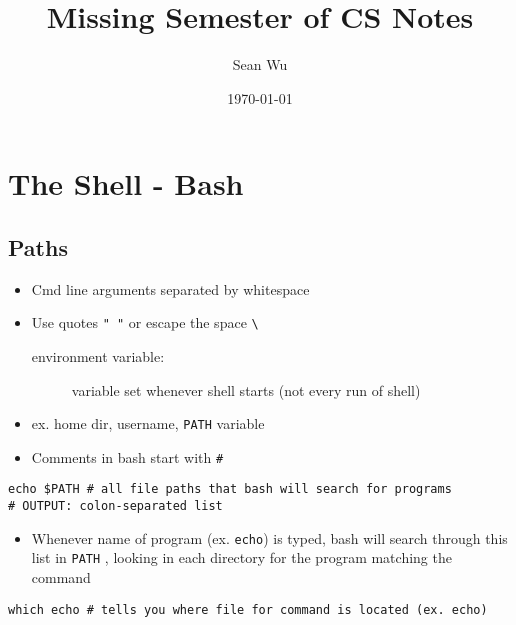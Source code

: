\documentclass[letterpaper,12pt]{article}
\begin{document}
\title{Missing Semester of CS Notes}
\author{Sean Wu}
\date{\today}
\maketitle

\tableofcontents

\pagebreak

\setlength{\parindent}{0em}
\setlength{\parskip}{1em}

\section{The Shell - Bash}

\subsection{Paths}

\begin{itemize}
 \item Cmd line arguments separated by whitespace
 \item Use quotes \lstinline{" "} or escape the space \lstinline{\ }

       \begin{description}
        \item[environment variable:] variable set whenever shell starts (not every run of shell)
       \end{description}

 \item ex. home dir, username, \lstinline{PATH} variable
 \item Comments in bash start with \lstinline{#}
\end{itemize}

\begin{lstlisting}
echo $PATH # all file paths that bash will search for programs
# OUTPUT: colon-separated list
\end{lstlisting}

\begin{itemize}
 \item Whenever name of program (ex. \lstinline{echo}) is typed, bash will search through this list in \lstinline{PATH} , looking in each directory for the program matching the command
\end{itemize}

\begin{lstlisting}
which echo # tells you where file for command is located (ex. echo)
\end{lstlisting}
\end{document}
